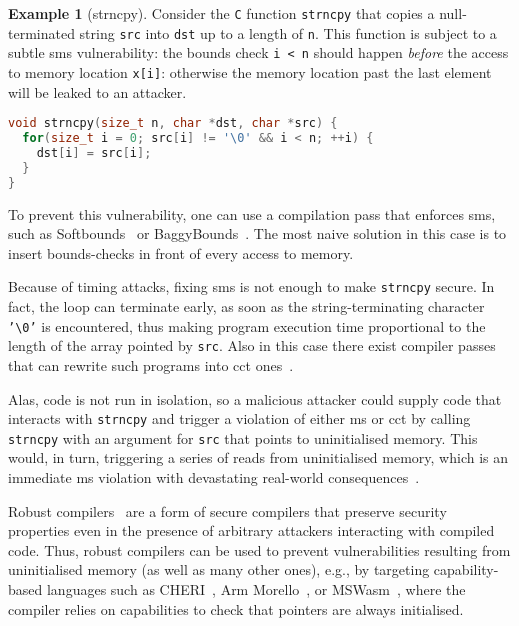 \documentclass[dvipsnames,conference]{IEEEtran}
\theoremstyle{definition}
\newtheorem{exampleenv}{Example}[section]
\begin{document}
\begin{exampleenv}[strncpy]\label{ex:strncpy}
Consider the \texttt{C} function \texttt{strncpy} that copies a null-terminated string \texttt{src} into \texttt{dst} up to a length of \texttt{n}.
This function is subject to a subtle \gls*{sms} vulnerability: the bounds check \texttt{i < n} should happen {\it before} the access to memory location \texttt{x[i]}: otherwise
the memory location past the last element will be leaked to an attacker.
\begin{lstlisting}[language=c,basicstyle=\footnotesize\ttfamily,morekeywords={size_t}]
void strncpy(size_t n, char *dst, char *src) {
  for(size_t i = 0; src[i] != '\0' && i < n; ++i) {
    dst[i] = src[i];
  }
}
\end{lstlisting}

To prevent this vulnerability, one can use a compilation pass that enforces \gls*{sms}, such as Softbounds~\cite{nagarakatte2009soft} or BaggyBounds~\cite{akritidis2009baggy}.
The most naive solution in this case is to insert bounds-checks in front of every access to memory.

Because of timing attacks, fixing \gls*{sms} is not enough to make \texttt{strncpy} secure.
In fact, the loop can terminate early, as soon as the string-terminating character \texttt{'\textbackslash 0'} is encountered, thus making program execution time proportional to the length of the array pointed by \texttt{src}.
Also in this case there exist compiler passes that can rewrite such programs into \gls*{cct} ones~\cite{cauligi2019fact}.

Alas, code is not run in isolation, so a malicious attacker could supply code that interacts with \texttt{strncpy} and trigger a violation of either \gls*{ms} or \gls*{cct} by calling \texttt{strncpy} with an argument for \texttt{src} that points to uninitialised memory.
This would, in turn, triggering a series of reads from uninitialised memory, which is an immediate \gls*{ms} violation with devastating real-world consequences~\cite{uninit-0,uninit-1,uninit-2,uninit-3,uninit-4}.

Robust compilers~\cite{abate2019jour} are a form of secure compilers that preserve security properties even in the presence of arbitrary attackers interacting with compiled code.
Thus, robust compilers can be used to prevent vulnerabilities resulting from uninitialised memory (as well as many other ones), e.g., by targeting capability-based languages such as CHERI~\cite{woodruff2014CHERI}, Arm Morello~\cite{arm-morello}, or MSWasm~\cite{michael2023mswasm}, where the compiler relies on capabilities to check that pointers are always initialised.
\end{exampleenv}
\end{document}
